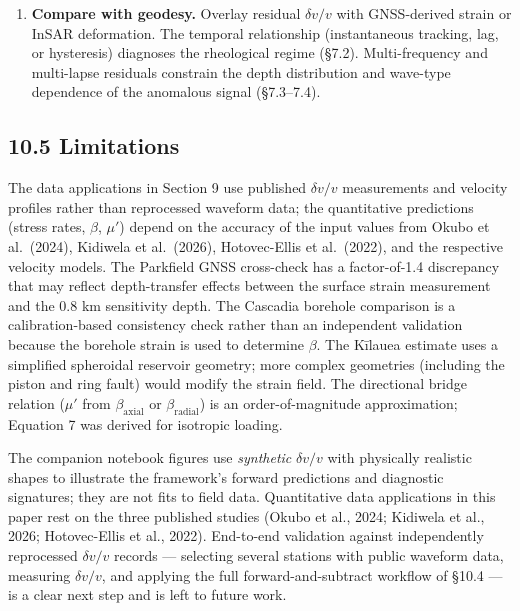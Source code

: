 \documentclass[12pt]{article}
\begin{document}
\begin{enumerate}
  \textbf{Subtract and interpret residuals.} Remove the modeled
  environmental contributions from the observed \(\delta v/v\) time
  series. Residuals may contain tectonic, volcanic, or anthropogenic
  signals. A robust residual should persist across the top-ranked window
  ensemble.
\item
  \textbf{Compare with geodesy.} Overlay residual \(\delta v/v\) with
  GNSS-derived strain or InSAR deformation. The temporal relationship
  (instantaneous tracking, lag, or hysteresis) diagnoses the rheological
  regime (§7.2). Multi-frequency and multi-lapse residuals constrain the
  depth distribution and wave-type dependence of the anomalous signal
  (§7.3--7.4).
\end{enumerate}

\subsection{10.5 Limitations}\label{limitations}

The data applications in Section 9 use published \(\delta v/v\)
measurements and velocity profiles rather than reprocessed waveform
data; the quantitative predictions (stress rates, \(\beta\), \(\mu'\))
depend on the accuracy of the input values from Okubo et al.~(2024),
Kidiwela et al.~(2026), Hotovec-Ellis et al.~(2022), and the respective
velocity models. The Parkfield GNSS cross-check has a factor-of-1.4
discrepancy that may reflect depth-transfer effects between the surface
strain measurement and the 0.8 km sensitivity depth. The Cascadia
borehole comparison is a calibration-based consistency check rather than
an independent validation because the borehole strain is used to
determine \(\beta\). The Kīlauea estimate uses a simplified spheroidal
reservoir geometry; more complex geometries (including the piston and
ring fault) would modify the strain field. The directional bridge
relation (\(\mu'\) from \(\beta_{\text{axial}}\) or
\(\beta_{\text{radial}}\)) is an order-of-magnitude approximation;
Equation 7 was derived for isotropic loading.

The companion notebook figures use \emph{synthetic} \(\delta v/v\) with
physically realistic shapes to illustrate the framework's forward
predictions and diagnostic signatures; they are not fits to field data.
Quantitative data applications in this paper rest on the three published
studies (Okubo et al., 2024; Kidiwela et al., 2026; Hotovec-Ellis et
al., 2022). End-to-end validation against independently reprocessed
\(\delta v/v\) records --- selecting several stations with public
waveform data, measuring \(\delta v/v\), and applying the full
forward-and-subtract workflow of §10.4 --- is a clear next step and is
left to future work.
\end{document}
